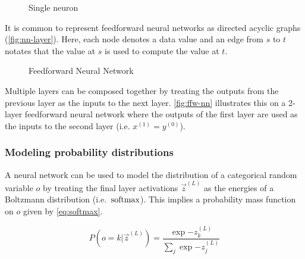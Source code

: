 \begin{figure}[htpb]
    \centering
    
    \caption{Single neuron}
    \label{fig:nn-single}
\end{figure}

It is common to represent feedforward neural networks as directed acyclic
graphs (\autoref{fig:nn-layer}). Here, each node denotes a data value and
an edge from $s$ to $t$ notates that the value at $s$ is used to compute the
value at $t$.

\begin{figure}[htpb]
    \centering
    
    \caption{Feedforward Neural Network}
    \label{fig:nn-ffw}
\end{figure}

%     

Multiple layers can be composed together by treating the outputs from the previous layer
as the inputs to the next layer. \autoref{fig:ffw-nn} illustrates this on a 2-layer
feedforward neural network where the outputs of the first layer are used as the
inputs to the second layer (i.e. $x^{(1)} = y^{(0)}$).


%     


\subsubsection{Modeling probability distributions}

A neural network can be used to model the distribution of a categorical random
variable $o$ by treating the final layer activations $\vec{z}^{(L)}$ as the
energies of a Boltzmann distribution (i.e.\ $\operatorname*{softmax}$). This implies a
probability mass function on $o$ given by \autoref{eq:softmax}.

\begin{equation}
    \label{eq:softmax}
    P(o = k | \vec{z}^{(L)}) = \frac{\exp{-z^{(L)}_k}}{ \sum_{j} \exp{-z^{(L)}_j} }
\end{equation}

